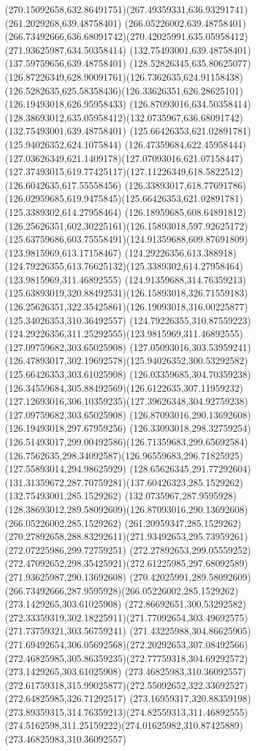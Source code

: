 {{	\curveto(270.15092658,632.86491751)(267.49359331,636.93291741)(261.2029268,639.48758401)
	\lineto(266.05226002,639.48758401)
	\curveto(266.73492666,636.68091742)(270.42025991,635.05958412)(271.93625987,634.50358414)
	\moveto(132.75493001,639.48758401)
	\lineto(137.59759656,639.48758401)
	\curveto(128.52826345,635.80625077)(126.87226349,628.90091761)(126.7362635,624.91158438)
	\curveto(126.5282635,625.58358436)(126.33626351,626.28625101)(126.19493018,626.95958433)
	\lineto(126.87093016,634.50358414)
	\curveto(128.38693012,635.05958412)(132.0735967,636.68091742)(132.75493001,639.48758401)
	\moveto(125.66426353,621.02891781)
	\lineto(125.94026352,624.1075844)
	\curveto(126.47359684,622.45958444)(127.03626349,621.1409178)(127.07093016,621.07158447)
	\curveto(127.37493015,619.77425117)(127.11226349,618.5822512)(126.6042635,617.55558456)
	\curveto(126.33893017,618.77691786)(126.02959685,619.9475845)(125.66426353,621.02891781)
	\moveto(125.3389302,614.27958464)
	\curveto(126.18959685,608.64891812)(126.25626351,602.30225161)(126.15893018,597.92625172)
	\curveto(125.63759686,603.75558491)(124.91359688,609.87691809)(123.9815969,613.17158467)
	\curveto(124.29226356,613.388918)(124.79226355,613.76625132)(125.3389302,614.27958464)
	\moveto(123.9815969,311.46892555)
	\curveto(124.91359688,314.76359213)(125.63893019,320.88492531)(126.15893018,326.71559183)
	\curveto(126.25626351,322.35425861)(126.19093018,316.00225877)(125.34026353,310.36492557)
	\curveto(124.79226355,310.87559223)(124.29226356,311.25292555)(123.9815969,311.46892555)
	\moveto(127.09759682,303.65025908)
	\curveto(127.05093016,303.53959241)(126.47893017,302.19692578)(125.94026352,300.53292582)
	\lineto(125.66426353,303.61025908)
	\curveto(126.03359685,304.70359238)(126.34559684,305.88492569)(126.6122635,307.11959232)
	\curveto(127.12693016,306.10359235)(127.39626348,304.92759238)(127.09759682,303.65025908)
	\moveto(126.87093016,290.13692608)
	\lineto(126.19493018,297.67959256)
	\curveto(126.33093018,298.32759254)(126.51493017,299.00492586)(126.71359683,299.65692584)
	\curveto(126.7562635,298.34092587)(126.96559683,296.71825925)(127.55893014,294.98625929)
	\curveto(128.65626345,291.77292604)(131.31359672,287.70759281)(137.60426323,285.1529262)
	\lineto(132.75493001,285.1529262)
	\curveto(132.0735967,287.9595928)(128.38693012,289.58092609)(126.87093016,290.13692608)
	\moveto(266.05226002,285.1529262)
	\lineto(261.20959347,285.1529262)
	\curveto(270.27892658,288.83292611)(271.93492653,295.73959261)(272.07225986,299.72759251)
	\curveto(272.27892653,299.05559252)(272.47092652,298.35425921)(272.61225985,297.68092589)
	\lineto(271.93625987,290.13692608)
	\curveto(270.42025991,289.58092609)(266.73492666,287.9595928)(266.05226002,285.1529262)
	\moveto(273.1429265,303.61025908)
	\lineto(272.86692651,300.53292582)
	\curveto(272.33359319,302.18225911)(271.77092654,303.49692575)(271.73759321,303.56759241)
	\curveto(271.43225988,304.86625905)(271.69492654,306.05692568)(272.20292653,307.08492566)
	\curveto(272.46825985,305.86359235)(272.77759318,304.69292572)(273.1429265,303.61025908)
	\moveto(273.46825983,310.36092557)
	\curveto(272.61759318,315.99025877)(272.55092652,322.33692527)(272.64825985,326.71292517)
	\curveto(273.16959317,320.88359198)(273.89359315,314.76359213)(274.82559313,311.46892555)
	\curveto(274.5162598,311.25159222)(274.01625982,310.87425889)(273.46825983,310.36092557)
}
}
